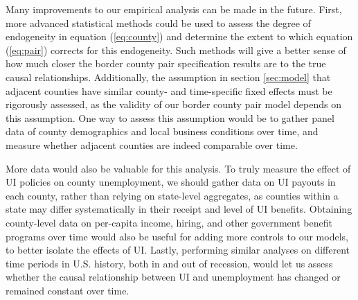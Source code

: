 \documentclass[12pt]{article}
\begin{document}
Many improvements to our empirical analysis can be made in the future. First, more advanced statistical methods could be used to assess the degree of endogeneity in equation (\ref{eq:county}) and determine the extent to which equation (\ref{eq:pair}) corrects for this endogeneity. Such methods will give a better sense of how much closer the border county pair specification results are to the true causal relationships. Additionally, the assumption in section \ref{sec:model} that adjacent counties have similar county- and time-specific fixed effects must be rigorously assessed, as the validity of our border county pair model depends on this assumption. One way to assess this assumption would be to gather panel data of county demographics and local business conditions over time, and measure whether adjacent counties are indeed comparable over time.

More data would also be valuable for this analysis. To truly measure the effect of UI policies on county unemployment, we should gather data on UI payouts in each county, rather than relying on state-level aggregates, as counties within a state may differ systematically in their receipt and level of UI benefits. Obtaining county-level data on per-capita income, hiring, and other government benefit programs over time would also be useful for adding more controls to our models, to better isolate the effects of UI. Lastly, performing similar analyses on different time periods in U.S. history, both in and out of recession, would let us assess whether the causal relationship between UI and unemployment has changed or remained constant over time.


\clearpage

\end{document}
